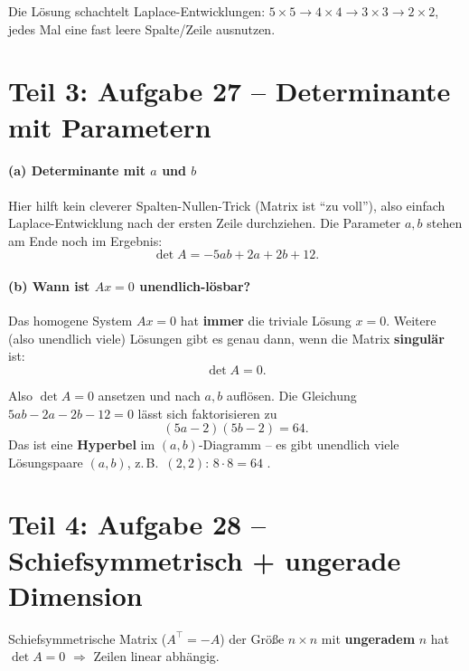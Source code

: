 \documentclass[a4paper,12pt]{article}
\begin{document}
Die L\"osung schachtelt Laplace-Entwicklungen: $5\times 5 \to 4\times 4 \to 3\times 3 \to 2\times 2$, jedes Mal eine fast leere Spalte/Zeile ausnutzen.

\newpage

\part*{Teil 3: Aufgabe 27 -- Determinante mit Parametern}

\subsection*{(a) Determinante mit $a$ und $b$}

Hier hilft kein cleverer Spalten-Nullen-Trick (Matrix ist ``zu voll''), also einfach Laplace-Entwicklung nach der ersten Zeile durchziehen. Die Parameter $a, b$ stehen am Ende noch im Ergebnis:
\[
\det A = -5ab + 2a + 2b + 12.
\]

\subsection*{(b) Wann ist $Ax = 0$ unendlich-l\"osbar?}

\begin{merkbox}[title={Schl\"ussel}]
Das homogene System $Ax = 0$ hat \textbf{immer} die triviale L\"osung $x = 0$. Weitere (also unendlich viele) L\"osungen gibt es genau dann, wenn die Matrix \textbf{singul\"ar} ist:
\[
\det A = 0.
\]
\end{merkbox}

Also $\det A = 0$ ansetzen und nach $a, b$ aufl\"osen. Die Gleichung $5ab - 2a - 2b - 12 = 0$ l\"asst sich faktorisieren zu
\[
(5a - 2)(5b - 2) = 64.
\]
Das ist eine \textbf{Hyperbel} im $(a, b)$-Diagramm -- es gibt unendlich viele L\"osungspaare $(a, b)$, z.\,B.\ $(2, 2)$: $8 \cdot 8 = 64$ \checkmark.

\newpage

\part*{Teil 4: Aufgabe 28 -- Schiefsymmetrisch + ungerade Dimension}

\begin{merkbox}[title={Was zu zeigen ist}]
Schiefsymmetrische Matrix ($A^\top = -A$) der Gr\"o\ss e $n \times n$ mit \textbf{ungeradem} $n$ hat $\det A = 0$ $\Rightarrow$ Zeilen linear abh\"angig.
\end{merkbox}
\end{document}
